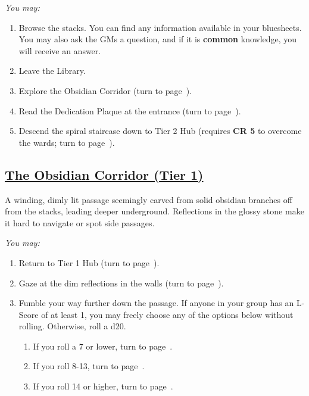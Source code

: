 \documentclass[sheet]{GL2020}
\begin{document}
\begingroup
\itshape
You may:
\begin{enumerate}[A]
	\item Browse the stacks. You can find any information available in your bluesheets. You may also ask the GMs a question, and if it is \textbf{common} knowledge, you will receive an answer.
	\item Leave the Library.
	\item Explore the Obsidian Corridor (turn to page~\pageref{ObsidianCorridor}).
	\item Read the Dedication Plaque at the entrance (turn to page~\pageref{LibraryDedication}).
	\item Descend the spiral staircase down to Tier 2 Hub (requires \textbf{CR 5} to overcome the wards; turn to page~\pageref{TierTwoHub}).
\end{enumerate}
\endgroup

\clearpage

\begin{center}\section*{\underline{The Obsidian Corridor (Tier 1)}}\end{center}
\label{ObsidianCorridor}

A winding, dimly lit passage seemingly carved from solid obsidian branches off from the stacks, leading deeper underground. Reflections in the glossy stone make it hard to navigate or spot side passages. 

\vspace{0.5cm}

\begingroup
\itshape
You may:
\begin{enumerate}[A]
	\item Return to Tier 1 Hub (turn to page~\pageref{TierTwoHub}).
	\item Gaze at the dim reflections in the walls (turn to page~\pageref{AbyssGazesAlso}).
	\item Fumble your way further down the passage. If anyone in your group has an L-Score of at least 1, you may freely choose any of the options below without rolling. Otherwise, roll a d20.
	\begin{enumerate}
		\item If you roll a 7 or lower, turn to page~\pageref{ObsidianGreenhouse}.
		\item If you roll 8-13, turn to page~\pageref{HallofTinyDrawers}.
		\item If you roll 14 or higher, turn to page~\pageref{MeadowofBlackCrocuses}.
	\end{enumerate}
\end{enumerate}
\endgroup
\end{document}
